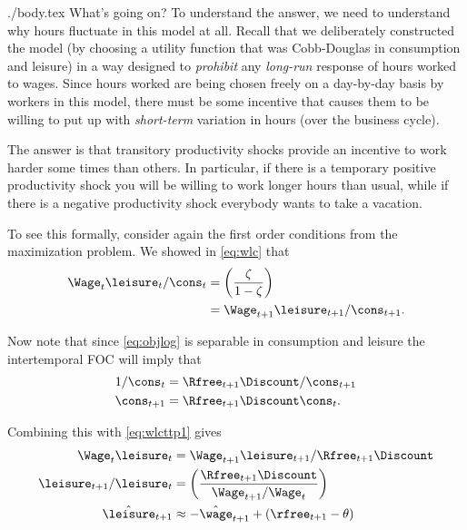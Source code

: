 \documentclass{handout}
\begin{document}
\begin{verbatimwrite}{./body.tex}
What's going on?  To understand the answer, we need to understand why 
hours fluctuate in this model at all.  Recall that we deliberately constructed the 
model (by choosing a utility function that was Cobb-Douglas in consumption and 
leisure) in a way designed to {\it prohibit} any {\it long-run} response of hours 
worked to wages.  Since hours worked are being chosen freely on a
day-by-day basis by workers in this model, there must be some 
incentive that causes them to be willing to put up with {\it short-term}
variation in hours (over the business cycle).

The answer is that transitory productivity shocks provide an incentive 
to work harder some times than others.  In particular, if there is a 
temporary positive productivity shock you will be willing to work longer hours 
than usual, while if there is a negative productivity shock everybody 
wants to take a vacation.  

To see this formally, consider again the first order conditions from 
the maximization problem.  We showed in \eqref{eq:wlc} that 
\begin{equation}\begin{gathered}\begin{aligned}
        \Wage_{t}\leisure_{t}/\cons_{t} & =  \left(\frac{\zeta}{1-\zeta}\right)  \\
         & =  \Wage_{t+1}\leisure_{t+1}/\cons_{t+1}.  \label{eq:wlcttp1}
\end{aligned}\end{gathered}\end{equation}

Now note that since \eqref{eq:objlog} is separable in consumption
and leisure the intertemporal FOC will imply that
\begin{equation}\begin{gathered}\begin{aligned}
        1/\cons_{t}   & =  \Rfree_{t+1}\Discount /\cons_{t+1}
\\  \cons_{t+1}   & =  \Rfree_{t+1}\Discount \cons_{t}. 
\end{aligned}\end{gathered}\end{equation}

Combining this with \eqref{eq:wlcttp1} gives
\begin{equation}\begin{gathered}\begin{aligned}
        \Wage_{t}\leisure_{t} & =  \Wage_{t+1}\leisure_{t+1}/\Rfree_{t+1}\Discount  \\
        \leisure_{t+1}/\leisure_{t} & =  \left(\frac{\Rfree_{t+1}\Discount}{\Wage_{t+1}/\Wage_{t}}\right)  \\
        \hat{\leisure }_{t+1} & \approx  -\hat{\wage }_{t+1}+(\rfree_{t+1}-\theta)
\end{aligned}\end{gathered}\end{equation}


\end{verbatimwrite}
\end{document}
